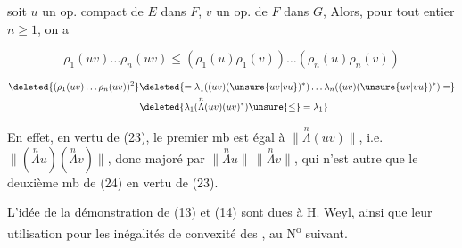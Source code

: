  soit $u$ un op. compact de $E$ dans $F$, $v$ un op.  de $F$ dans $G$,  Alors, pour tout entier $n\geq1$, on a

\[
\rho_1(uv)\ldots\rho_n(uv)\leq(\rho_1(u)\rho_1(v))\ldots(\rho_n(u)\rho_n(v))\tag*{(24)}
\]


\[
\begin{aligned}
\deleted{(\rho_1(uv)\ldots\rho_n(uv))^2}&\deleted{=\lambda_1((uv)(\unsure{uv|vu})^*)\ldots\lambda_n((uv)(\unsure{uv|vu})^*)=}\\
&\deleted{\lambda_1(\overset{n}{\Lambda}(uv)(uv)^*)\unsure{\leq}=\lambda_1}
\end{aligned}
\]

En effet, en vertu de  (23), le premier mb est égal à $\lVert\overset{n}{\Lambda}(uv)\rVert$, i.e. $\lVert(\overset{n}{\Lambda}u)(\overset{n}{\Lambda}v)\rVert$,  donc majoré par $\lVert\overset{n}{\Lambda}u\rVert\,\lVert\overset{n}{\Lambda}v\rVert$, qui n'est autre que le deuxième mb de (24) en vertu de (23).

L'idée de la démonstration de (13) et (14) sont dues à H. Weyl, ainsi que leur utilisation pour les inégalités de convexité des , au \deleted{\S} N\textsuperscript{o} suivant.
